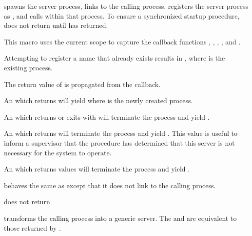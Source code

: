  spawns the server process, links to
the calling process, registers the server process as , and calls
 within that process. To ensure a
synchronized startup procedure,  does
not return until  has returned.

This macro uses the current scope to capture the callback functions
, , ,
, and .

Attempting to register a name that already exists results in
, where
 is the existing process.

The return value of  is propagated from
the  callback.

An  which returns  will yield  where
 is the newly created process.

An  which returns  or exits
with  will terminate the process and yield
.

An  which returns  will terminate the
process and yield . This value is useful to inform a
supervisor that the  procedure has determined that this
server is not necessary for the system to operate.

An  which returns  values will terminate the
process and yield .

\begin{syntax}
\end{syntax}
\returns{}

 behaves the same as
 except that it does not link to the
calling process.

\begin{syntax}
\end{syntax}
\returns{} does not return

 transforms the calling process into a
generic server. The  and  are equivalent to
those returned by .

